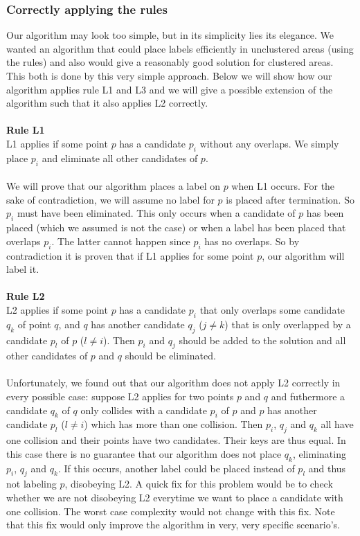 \documentclass[crop=false,a4paper,oneside,11pt]{article}
\begin{document}
\subsubsection{Correctly applying the rules}
Our algorithm may look too simple, but in its simplicity lies its elegance. We wanted an algorithm that could place labels efficiently in unclustered areas (using the rules) and also would give a reasonably good solution for clustered areas. This both is done by this very simple approach. Below we will show how our algorithm applies rule L1 and L3 and we will give a possible extension of the algorithm such that it also applies L2 correctly.\\
\\
\textbf{Rule L1}\\
L1 applies if some point $p$ has a candidate $p_i$ without any overlaps. We simply place $p_i$ and eliminate all other candidates of $p$.\\
\\
We will prove that our algorithm places a label on $p$ when L1 occurs. For the sake of contradiction, we will assume no label for $p$ is placed after termination. So $p_i$ must have been eliminated. This only occurs when a candidate of $p$ has been placed (which we assumed is not the case) or when a label has been placed that overlaps $p_i$. The latter cannot happen since $p_i$ has no overlaps. So by contradiction it is proven that if L1 applies for some point $p$, our algorithm will label it.\\
\\
\textbf{Rule L2}\\
L2 applies if some point $p$ has a candidate $p_i$ that only overlaps some candidate $q_k$ of point $q$, and $q$ has another
candidate $q_j$ ($j \neq k$) that is only overlapped by a candidate $p_l$ of $p$ ($l \neq i$). Then $p_i$
and $q_j$ should be added to the solution and all other candidates of $p$ and $q$ should be eliminated.\\
\\
Unfortunately, we found out that our algorithm does not apply L2 correctly in every possible case: suppose L2 applies for two points $p$ and $q$ and futhermore a candidate $q_k$ of $q$ only collides with a candidate $p_i$ of $p$ and $p$ has another candidate $p_l$ ($l\neq i$) which has more than one collision. Then $p_i$, $q_j$ and $q_k$ all have one collision and their points have two candidates. Their keys are thus equal. In this case there is no guarantee that our algorithm does not place $q_k$, eliminating $p_i$, $q_j$ and $q_k$. If this occurs, another label could be placed instead of $p_l$ and thus not labeling $p$, disobeying L2. A quick fix for this problem would be to check whether we are not disobeying L2 everytime we want to place a candidate with one collision. The worst case complexity would not change with this fix. Note that this fix would only improve the algorithm in very, very specific scenario's.\\
\end{document}
